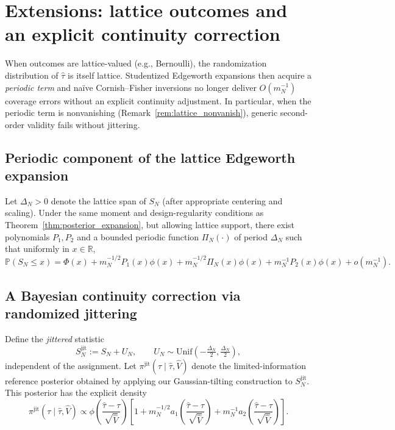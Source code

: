 \documentclass[aos]{imsart}
\theoremstyle{definition}
\theoremstyle{plain}
\newcommand{\Prb}{\mathbb{P}}
\newcommand{\mN}{m_N}
\newcommand{\R}{\mathbb{R}}
\newcommand{\SN}{S_N}
\begin{document}
\section{Extensions: lattice outcomes and an explicit continuity correction}\label{sec:lattice}
When outcomes are lattice-valued (e.g., Bernoulli), the randomization distribution of $\hat\tau$ is itself lattice.
Studentized Edgeworth expansions then acquire a \emph{periodic term} and naïve Cornish--Fisher inversions no longer
deliver $O(\mN^{-1})$ coverage errors without an explicit continuity adjustment.
In particular, when the periodic term is nonvanishing (Remark~\ref{rem:lattice_nonvanish}), generic second-order validity fails without jittering.

\subsection{Periodic component of the lattice Edgeworth expansion}
Let $\Delta_N>0$ denote the lattice span of $\SN$ (after appropriate centering and scaling).
Under the same moment and design-regularity conditions as Theorem~\ref{thm:posterior_expansion}, but allowing lattice support,
there exist polynomials $P_1,P_2$ and a bounded periodic function $\Pi_N(\cdot)$ of period $\Delta_N$ such that
uniformly in $x\in\R$,
\begin{equation}\label{eq:lattice-edgeworth}
\Prb(\SN\le x)
=
\Phi(x)
+ \mN^{-1/2} P_1(x)\phi(x)
+ \mN^{-1/2}\Pi_N(x)\phi(x)
+ \mN^{-1} P_2(x)\phi(x)
+ o(\mN^{-1}).
\end{equation}

\subsection{A Bayesian continuity correction via randomized jittering}
Define the \emph{jittered} statistic
\[
\SN^{\mathrm{jit}} := \SN + U_N, \qquad U_N\sim\mathrm{Unif}\!\left(-\tfrac{\Delta_N}{2},\tfrac{\Delta_N}{2}\right),
\]
independent of the assignment.
Let $\pi^{\mathrm{jit}}(\tau\mid \hat\tau,\hat V)$ denote the limited-information reference posterior obtained by
applying our Gaussian-tilting construction to $\SN^{\mathrm{jit}}$.
This posterior has the explicit density
\begin{equation}\label{eq:jittered-posterior}
\pi^{\mathrm{jit}}(\tau\mid \hat\tau,\hat V)
\propto
\phi\!\left(\frac{\hat\tau-\tau}{\sqrt{\hat V}}\right)
\left[
1+\mN^{-1/2}a_1\!\left(\frac{\hat\tau-\tau}{\sqrt{\hat V}}\right)
+\mN^{-1}a_2\!\left(\frac{\hat\tau-\tau}{\sqrt{\hat V}}\right)
\right].
\end{equation}
\end{document}
